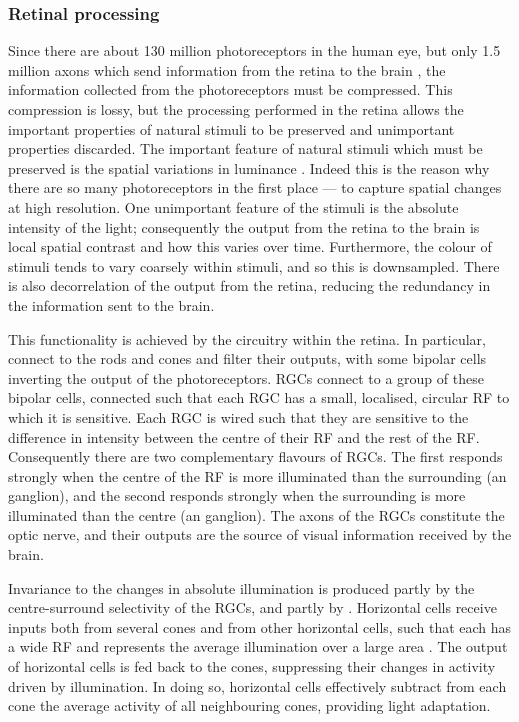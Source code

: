 \subsubsection{Retinal processing}

Since there are about \num{130} million photoreceptors in the human eye, but only \num{1.5} million axons which send information from the retina to the brain \citep{Nassi2009}, the information collected from the photoreceptors must be compressed.
This compression is lossy, but the processing performed in the retina allows the important properties of natural stimuli to be preserved and unimportant properties discarded.
The important feature of natural stimuli which must be preserved is the spatial variations in luminance \citep[Chapter~11]{nsbook}.
Indeed this is the reason why there are so many photoreceptors in the first place --- to capture spatial changes at high resolution.
One unimportant feature of the stimuli is the absolute intensity of the light; consequently the output from the retina to the brain is local spatial contrast and how this varies over time.
Furthermore, the colour of stimuli tends to vary coarsely within stimuli, and so this is downsampled.
There is also decorrelation of the output from the retina, reducing the redundancy in the information sent to the brain.

This functionality is achieved by the circuitry within the retina.
In particular,  connect to the rods and cones and filter their outputs, with some bipolar cells inverting the output of the photoreceptors.
\acp{RGC} connect to a group of these bipolar cells, connected such that each \ac{RGC} has a small, localised, circular \ac{RF} to which it is sensitive.
Each \ac{RGC} is wired such that they are sensitive to the difference in intensity between the centre of their \ac{RF} and the rest of the \ac{RF}.
Consequently there are two complementary flavours of \acp{RGC}.
The first responds strongly when the centre of the \ac{RF} is more illuminated than the surrounding (an  ganglion), and the second responds strongly when the surrounding is more illuminated than the centre (an  ganglion).
The axons of the \acp{RGC} constitute the optic nerve, and their outputs are the source of visual information received by the brain.

Invariance to the changes in absolute illumination is produced partly by the centre-surround selectivity of the \acp{RGC}, and partly by .
Horizontal cells receive inputs both from several cones and from other horizontal cells, such that each has a wide \ac{RF} and represents the average illumination over a large area \citep[Chapter~11]{nsbook}.
The output of horizontal cells is fed back to the cones, suppressing their changes in activity driven by illumination.
In doing so, horizontal cells effectively subtract from each cone the average activity of all neighbouring cones, providing light adaptation.

